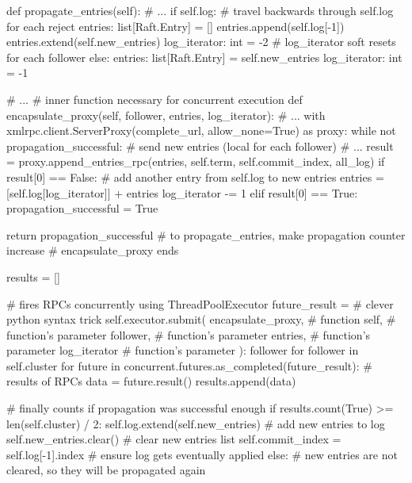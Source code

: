 \begin{python}[label={code:leaderPropagateEntries}, caption={Leader propagation procedure, for complete code refer to project's repository}]
def propagate_entries(self):        
    # ...          
    if self.log:                            # travel backwards through self.log for each reject
        entries: list[Raft.Entry] = []
        entries.append(self.log[-1])    
        entries.extend(self.new_entries)    
        log_iterator: int = -2              # log_iterator soft resets for each follower
    else:
        entries: list[Raft.Entry] = self.new_entries
        log_iterator: int = -1
        
    # ...
    # inner function necessary for concurrent execution
    def encapsulate_proxy(self, follower, entries, log_iterator):
        # ...
        with xmlrpc.client.ServerProxy(complete_url, allow_none=True) as proxy: 
            while not propagation_successful:
                # send new entries (local for each follower) 
                # ...
                result = proxy.append_entries_rpc(entries, self.term, self.commit_index, all_log)
                if result[0] == False:
                    # add another entry from self.log to new entries
                    entries = [self.log[log_iterator]] + entries 
                    log_iterator -= 1   
                elif result[0] == True:
                    propagation_successful = True

        return propagation_successful # to propagate_entries, make propagation counter increase 
        # encapsulate_proxy ends

    results = []

    # fires RPCs concurrently using ThreadPoolExecutor 
    future_result = {           # clever python syntax trick 
        self.executor.submit(
            encapsulate_proxy,  # function
            self,               # function's parameter
            follower,           # function's parameter
            entries,            # function's parameter
            log_iterator        # function's parameter
            ): follower for follower in self.cluster}
    for future in concurrent.futures.as_completed(future_result):
        # results of RPCs
        data = future.result()
        results.append(data)

    # finally counts if propagation was successful enough
    if results.count(True) >= len(self.cluster) / 2:
        self.log.extend(self.new_entries)               # add new entries to log
        self.new_entries.clear()                        # clear new entries list
        self.commit_index = self.log[-1].index          # ensure log gets eventually applied
    else:
    #   new entries are not cleared, so they will be propagated again
\end{python}

